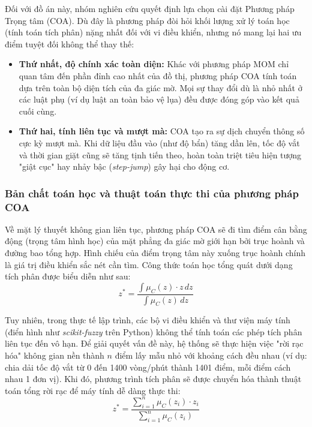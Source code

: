 \documentclass[12pt, a4paper]{article}
\begin{document}
Đối với đồ án này, nhóm nghiên cứu quyết định lựa chọn cài đặt Phương pháp Trọng tâm (COA). Dù đây là phương pháp đòi hỏi khối lượng xử lý toán học (tính toán tích phân) nặng nhất đối với vi điều khiển, nhưng nó mang lại hai ưu điểm tuyệt đối không thể thay thế:
\begin{itemize}
    \item \textbf{Thứ nhất, độ chính xác toàn diện:} Khác với phương pháp MOM chỉ quan tâm đến phần đỉnh cao nhất của đồ thị, phương pháp COA tính toán dựa trên toàn bộ diện tích của đa giác mờ. Mọi sự thay đổi dù là nhỏ nhất ở các luật phụ (ví dụ luật an toàn bảo vệ lụa) đều được đóng góp vào kết quả cuối cùng.
    \item \textbf{Thứ hai, tính liên tục và mượt mà:} COA tạo ra sự dịch chuyển thông số cực kỳ mượt mà. Khi dữ liệu đầu vào (như độ bẩn) tăng dần lên, tốc độ vắt và thời gian giặt cũng sẽ tăng tịnh tiến theo, hoàn toàn triệt tiêu hiện tượng "giật cục" hay nhảy bậc (\textit{step-jump}) gây hại cho động cơ.
\end{itemize}

\subsubsection{Bản chất toán học và thuật toán thực thi của phương pháp COA}
Về mặt lý thuyết không gian liên tục, phương pháp COA sẽ đi tìm điểm cân bằng động (trọng tâm hình học) của mặt phẳng đa giác mờ giới hạn bởi trục hoành và đường bao tổng hợp. Hình chiếu của điểm trọng tâm này xuống trục hoành chính là giá trị điều khiển sắc nét cần tìm. Công thức toán học tổng quát dưới dạng tích phân được biểu diễn như sau:
\begin{equation}
z^* = \frac{\int \mu_C(z) \cdot z \, dz}{\int \mu_C(z) \, dz}
\end{equation}

Tuy nhiên, trong thực tế lập trình, các bộ vi điều khiển và thư viện máy tính (điển hình như \textit{scikit-fuzzy} trên Python) không thể tính toán các phép tích phân liên tục đến vô hạn. Để giải quyết vấn đề này, hệ thống sẽ thực hiện việc "rời rạc hóa" không gian nền thành $n$ điểm lấy mẫu nhỏ với khoảng cách đều nhau (ví dụ: chia dải tốc độ vắt từ 0 đến 1400 vòng/phút thành 1401 điểm, mỗi điểm cách nhau 1 đơn vị). Khi đó, phương trình tích phân sẽ được chuyển hóa thành thuật toán tổng rời rạc để máy tính dễ dàng thực thi:
\begin{equation}
z^* = \frac{\sum_{i=1}^{n} \mu_C(z_i) \cdot z_i}{\sum_{i=1}^{n} \mu_C(z_i)}
\end{equation}
\end{document}
